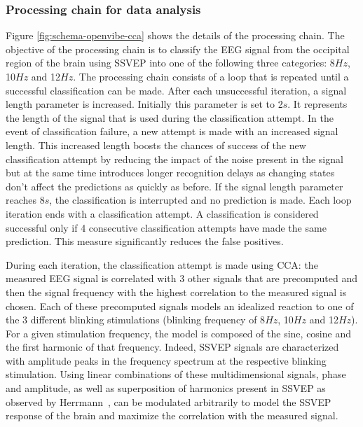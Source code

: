 \documentclass[smallextended]{svjour3}
\begin{document}
\subsubsection{Processing chain for data analysis}
Figure \ref{fig:schema-openvibe-cca} shows the details of the processing chain.
The objective of the processing chain is to classify the EEG signal from the occipital region of the brain using SSVEP into one of the following three categories: 8$Hz$, 10$Hz$ and 12$Hz$.
The processing chain consists of a loop that is repeated until a successful classification can be made.
After each unsuccessful iteration, a signal length parameter is increased. Initially this parameter is set to 2$s$.
It represents the length of the signal that is used during the classification attempt.
In the event of classification failure, a new attempt is made with an increased signal length.
This increased length boosts the chances of success of the new classification attempt by reducing the impact of the noise present in the signal
but at the same time introduces longer recognition delays as changing states don't affect the predictions as quickly as before.
If the signal length parameter reaches 8$s$, the classification is interrupted and no prediction is made.
Each loop iteration ends with a classification attempt.
A classification is considered successful only if 4 consecutive classification attempts have made the same prediction. This measure significantly reduces the false positives.

During each iteration, the classification attempt is made using CCA: the measured EEG signal is correlated with 3 other signals that are precomputed and then the signal frequency with the highest correlation to the measured signal is chosen.
Each of these precomputed signals models an idealized reaction to one of the 3 different blinking stimulations (blinking frequency of 8$Hz$, 10$Hz$ and 12$Hz$).
For a given stimulation frequency, the model is composed of the sine, cosine and the first harmonic of that frequency.
Indeed, SSVEP signals are characterized with amplitude peaks in the frequency spectrum at the respective blinking stimulation.
Using linear combinations of these multidimensional signals, phase and amplitude, as well as superposition of harmonics present in SSVEP as observed by Herrmann~\cite{herrmann2001}, can be modulated arbitrarily to model the SSVEP response of the brain and maximize the correlation with the measured signal.
\end{document}

